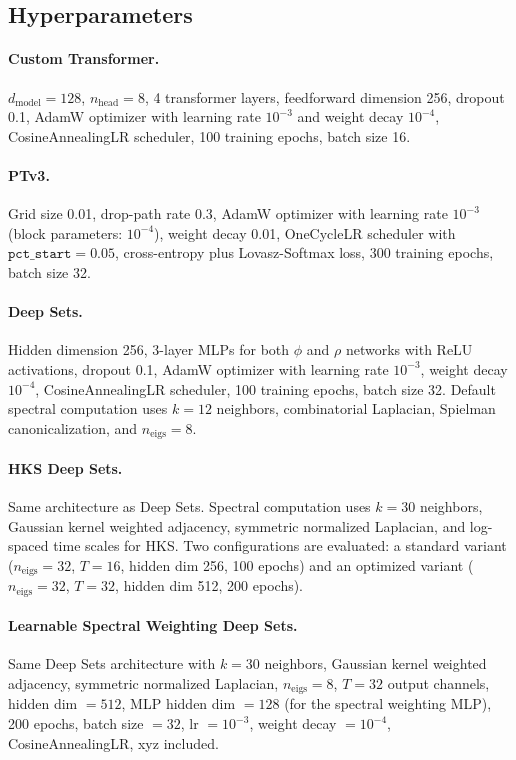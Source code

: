 \documentclass[11pt]{article}
\begin{document}
\subsection{Hyperparameters}

\paragraph{Custom Transformer.}
$d_{\text{model}} = 128$, $n_{\text{head}} = 8$, 4 transformer layers, feedforward
dimension 256, dropout 0.1, AdamW optimizer with learning rate $10^{-3}$ and weight decay
$10^{-4}$, CosineAnnealingLR scheduler, 100 training epochs, batch size 16.

\paragraph{PTv3.}
Grid size 0.01, drop-path rate 0.3, AdamW optimizer with learning rate $10^{-3}$ (block
parameters: $10^{-4}$), weight decay 0.01, OneCycleLR scheduler with
$\texttt{pct\_start} = 0.05$, cross-entropy plus Lovasz-Softmax loss, 300 training epochs,
batch size 32.

\paragraph{Deep Sets.}
Hidden dimension 256, 3-layer MLPs for both $\phi$ and $\rho$ networks with ReLU
activations, dropout 0.1, AdamW optimizer with learning rate $10^{-3}$, weight decay
$10^{-4}$, CosineAnnealingLR scheduler, 100 training epochs, batch size 32. Default
spectral computation uses $k = 12$ neighbors, combinatorial Laplacian, Spielman
canonicalization, and $n_{\text{eigs}} = 8$.

\paragraph{HKS Deep Sets.}
Same architecture as Deep Sets. Spectral computation uses $k = 30$ neighbors, Gaussian
kernel weighted adjacency, symmetric normalized Laplacian, and log-spaced time scales for
HKS. Two configurations are evaluated: a standard variant ($n_{\text{eigs}} = 32$,
$T = 16$, hidden dim 256, 100 epochs) and an optimized variant ($n_{\text{eigs}} = 32$,
$T = 32$, hidden dim 512, 200 epochs).

\paragraph{Learnable Spectral Weighting Deep Sets.}
Same Deep Sets architecture with $k = 30$ neighbors, Gaussian kernel weighted adjacency,
symmetric normalized Laplacian, $n_{\text{eigs}} = 8$, $T = 32$ output channels, hidden
dim $= 512$, MLP hidden dim $= 128$ (for the spectral weighting MLP), 200 epochs, batch
size $= 32$, lr $= 10^{-3}$, weight decay $= 10^{-4}$, CosineAnnealingLR, xyz included.
\end{document}
